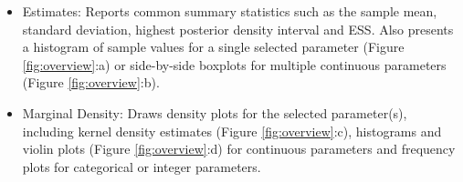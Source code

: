 \documentclass{bioinfo_tracer}
\begin{document}
\begin{itemize}

\item Estimates: Reports common summary statistics such as the sample mean, standard deviation, highest posterior density interval and ESS.  Also presents a histogram of sample values for a single selected parameter (Figure \ref{fig:overview}:a) or  side-by-side boxplots for multiple continuous parameters (Figure \ref{fig:overview}:b).

\item Marginal Density: Draws density plots for the selected parameter(s), including  kernel density estimates (Figure \ref{fig:overview}:c), histograms and violin plots (Figure \ref{fig:overview}:d) for continuous parameters and frequency plots for categorical or integer parameters.


\end{itemize}
\end{document}
